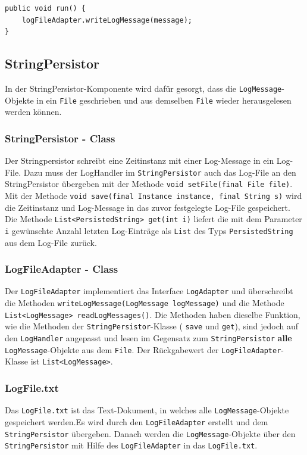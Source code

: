 \documentclass[12pt,a4paper,twosided]{scrartcl}
\begin{document}
\begin{verbatim}
public void run() {
	logFileAdapter.writeLogMessage(message);
}
\end{verbatim}

\subsection{StringPersistor}
In der StringPersistor-Komponente wird dafür gesorgt, dass die \texttt{LogMessage}-Objekte in ein \texttt{File} geschrieben und aus demselben \texttt{File} wieder herausgelesen werden können.

\subsubsection{StringPersistor - Class}
Der Stringpersistor schreibt eine Zeitinstanz mit einer Log-Message in ein Log-File. Dazu muss der LogHandler im  \texttt{StringPersistor} auch das Log-File an den StringPersistor übergeben mit der Methode  \texttt{void setFile(final File file)}. Mit der Methode  \texttt{void save(final Instance instance, final String s)} wird die Zeitinstanz und Log-Message in das zuvor festgelegte Log-File gespeichert. Die Methode  \texttt{List<PersistedString> get(int i)} liefert die mit dem Parameter  \texttt{i} gewünschte Anzahl letzten Log-Einträge als  \texttt{List} des Typs  \texttt{PersistedString} aus dem Log-File zurück.

\subsubsection{LogFileAdapter - Class}
Der  \texttt{LogFileAdapter} implementiert das Interface  \texttt{LogAdapter} und überschreibt die Methoden  \texttt{writeLogMessage(LogMessage logMessage)} und die Methode  \texttt{List<LogMessage> readLogMessages()}. Die Methoden haben dieselbe Funktion, wie die Methoden der  \texttt{StringPersistor}-Klasse ( \texttt{save} und  \texttt{get}), sind jedoch auf den  \texttt{LogHandler} angepasst und lesen im Gegensatz zum  \texttt{StringPersistor} \textbf{alle}  \texttt{LogMessage}-Objekte aus dem  \texttt{File}. Der Rückgabewert der  \texttt{LogFileAdapter}-Klasse ist  \texttt{List<LogMessage>}.

\subsubsection{LogFile.txt}
Das \texttt{LogFile.txt} ist das Text-Dokument, in welches alle \texttt{LogMessage}-Objekte gespeichert werden.Es wird durch den \texttt{LogFileAdapter} erstellt und dem \texttt{StringPersistor} übergeben. Danach werden die \texttt{LogMessage}-Objekte über den \texttt{StringPersistor} mit Hilfe des \texttt{LogFileAdapter} in das \texttt{LogFile.txt}.
\end{document}
